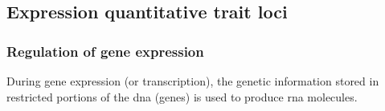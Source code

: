 \subsection{Expression quantitative trait loci}\label{sec:eqtl}






\subsubsection{Regulation of gene expression}
During gene expression (or transcription), the genetic information stored in restricted portions of the \gls{dna} (genes) is used to produce 
\gls{rna} molecules. 

